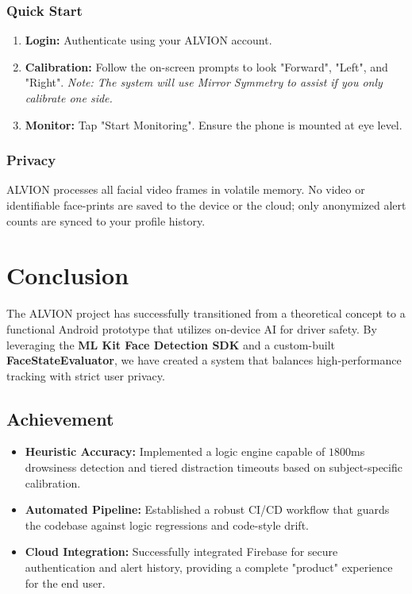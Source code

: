 \documentclass[11pt]{report}
\begin{document}
\subsection{Quick Start}
\begin{enumerate}
    \item \textbf{Login:} Authenticate using your ALVION account.
    \item \textbf{Calibration:} Follow the on-screen prompts to look "Forward", "Left", and "Right". \textit{Note: The system will use Mirror Symmetry to assist if you only calibrate one side.}
    \item \textbf{Monitor:} Tap "Start Monitoring". Ensure the phone is mounted at eye level.
\end{enumerate}

\subsection{Privacy}
ALVION processes all facial video frames in volatile memory. No video or identifiable face-prints are saved to the device or the cloud; only anonymized alert counts are synced to your profile history.

\clearpage

\chapter{Conclusion}
The ALVION project has successfully transitioned from a theoretical concept to a functional Android prototype that utilizes on-device AI for driver safety. By leveraging the \textbf{ML Kit Face Detection SDK} and a custom-built \textbf{FaceStateEvaluator}, we have created a system that balances high-performance tracking with strict user privacy.

\section{Achievement}
\begin{itemize}
    \item \textbf{Heuristic Accuracy:} Implemented a logic engine capable of $1800$ms drowsiness detection and tiered distraction timeouts based on subject-specific calibration.
    \item \textbf{Automated Pipeline:} Established a robust CI/CD workflow that guards the codebase against logic regressions and code-style drift.
    \item \textbf{Cloud Integration:} Successfully integrated Firebase for secure authentication and alert history, providing a complete "product" experience for the end user.
\end{itemize}
\end{document}
